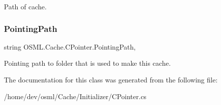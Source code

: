 Path of cache. 

\mbox{\label{classOSML_1_1Cache_1_1CPointer_a1d8b38fb53635653e55f4745d851bd92}} 
\subsubsection{\texorpdfstring{PointingPath}{PointingPath}}
{\footnotesize\ttfamily string O\+S\+M\+L.\+Cache.\+C\+Pointer.\+Pointing\+Path\hspace{0.3cm}{\ttfamily [get]}, {\ttfamily [set]}}



Pointing path to folder that is used to make this cache. 



The documentation for this class was generated from the following file\+:\begin{DoxyCompactItemize}
\item 
/home/dev/osml/\+Cache/\+Initializer/C\+Pointer.\+cs\end{DoxyCompactItemize}
